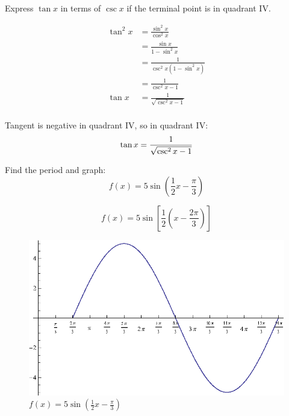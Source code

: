 \documentclass[fleqn,addpoints]{exam}
\begin{document}
\begin{questions}
\begin{parts}
      \end{parts}

      \question[10] Express $\tan x$ in terms of $\csc x$ if the terminal point is in quadrant IV.
        \begin{solution}
          \begin{align*}
            \tan^2 x & = \frac{\sin^2 x}{\cos^2 x} \\
                     & = \frac{\sin x}{1 - \sin^2 x} \\
                     & = \frac{1}{\csc^2 x (1 - \sin^2 x)} \\
                     & = \frac{1}{\csc^2 x - 1} \\
            \tan x   & = \frac{1}{\sqrt{\csc^2 x - 1}} \\
          \end{align*}

          Tangent is negative in quadrant IV, so in quadrant IV:
          \[
            \tan x = \frac{1}{\sqrt{\csc^2 x - 1}} \\
          \]

        \end{solution}

      \question[10]
        Find the period and graph:
        \[
          f(x) = 5 \sin \left( \frac{1}{2} x - \frac{\pi}{3} \right)
        \]

        \begin{solution}
          \[
            f(x) = 5 \sin \left[ \frac{1}{2} \left( x - \frac{2 \pi}{3} \right) \right]
          \]

          \begin{figure}[H]
            \centering
            \includegraphics{graph1.eps}
            \caption{$f(x) = 5 \sin \left( \frac{1}{2} x - \frac{\pi}{3} \right)$}
          \end{figure}


\end{solution}
\end{questions}
\end{document}
